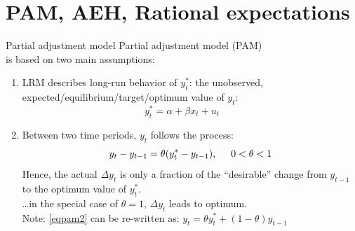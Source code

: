 \documentclass{beamer}
\begin{document}
\section{PAM, AEH, Rational expectations}

\begin{frame}{Partial adjustment model}
Partial adjustment model (PAM) \\is based on two main assumptions:
\begin{enumerate}
\item LRM describes long-run behavior of $y_t^{\ast}$: the unobserved, expected/equilibrium/target/optimum value of $y_t$:
\begin{equation}
{y}_t^\ast = \alpha + \beta x_t + u_t  ~~~~~~~~  \label{eqpam1} 
\end{equation}
\item Between two time periods, $y_t$ follows the process:
\begin{equation}
y_t - y_{t-1} = \theta ( y_t^\ast-y_{t-1}), \hspace{0.5cm} 0 < \theta < 1 \label{eqpam2}
\end{equation}
Hence, the actual $\Delta y_t$ is only a fraction of the ``desirable'' change from $y_{t-1}$ to the optimum value of $y_t^\ast$.
\\ \dots in the special case of $\theta = 1$, $\Delta y_t$ leads to optimum.\\
\medskip
Note: \eqref{eqpam2} can be re-written as: $y_t= \theta {y}_t^\ast + (1-\theta)y_{t-1} $
\end{enumerate}

\end{frame}
\end{document}
